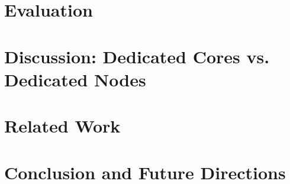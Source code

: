 \documentclass[preprint]{elsarticle}
\begin{document}
\section{Evaluation}
\label{sec:evaluation}

%

\section{Discussion: Dedicated Cores vs. Dedicated Nodes}
\label{sec:discussion}


\section{Related Work}
\label{sec:related}


\section{Conclusion and Future Directions}
\label{sec:conclusion}














\end{document}
